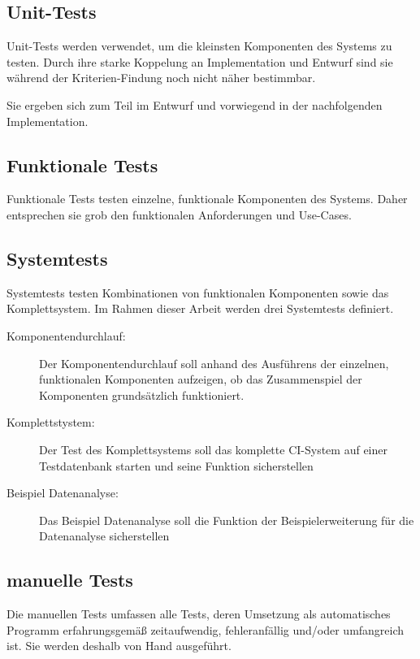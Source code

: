 \subsection{Unit-Tests}

Unit-Tests werden verwendet, um die kleinsten Komponenten des Systems zu testen.
Durch ihre starke Koppelung an Implementation und Entwurf
sind sie w\"ahrend der Kriterien-Findung noch nicht n\"aher bestimmbar.

Sie ergeben sich zum Teil im Entwurf und vorwiegend in
der nachfolgenden Implementation.

\subsection{Funktionale Tests}

Funktionale Tests testen einzelne, funktionale Komponenten des Systems.
Daher entsprechen sie grob den funktionalen Anforderungen und Use-Cases.

\subsection{Systemtests}

Systemtests testen Kombinationen von funktionalen Komponenten sowie das Komplettsystem.
Im Rahmen dieser Arbeit werden drei Systemtests definiert.


\begin{description}
  \item[Komponentendurchlauf:]
    Der Komponentendurchlauf soll anhand des Ausführens der einzelnen, funktionalen Komponenten aufzeigen,
    ob das Zusammenspiel der Komponenten grunds\"atzlich funktioniert.
  \item[Komplettstystem:]
    Der Test des Komplettsystems soll das komplette CI-System auf einer Testdatenbank starten
    und seine Funktion sicherstellen
  \item[Beispiel Datenanalyse:]
    Das Beispiel Datenanalyse soll die Funktion der Beispielerweiterung für die Datenanalyse sicherstellen
\end{description}

\subsection{manuelle Tests}

Die manuellen Tests umfassen alle Tests,
deren Umsetzung als automatisches Programm erfahrungsgemäß zeitaufwendig,
fehleranfällig und/oder umfangreich ist.
Sie werden deshalb von Hand ausgeführt.

